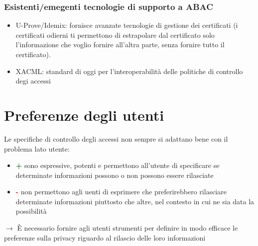 \documentclass{report}
\begin{document}
\subsubsection{Esistenti/emegenti tecnologie di supporto a ABAC}
\begin{itemize}
    \item U-Prove/Idemix: fornisce avanzate tecnologie di gestione dei certificati (i certificati odierni ti permettono di estrapolare dal certificato solo
    l'informazione che voglio fornire all'altra parte, senza fornire tutto il certificato).
    \item XACML: standard di oggi per l'interoperabilità delle politiche di controllo degi accessi
\end{itemize}

\newpage
\section{Preferenze degli utenti}

Le specifiche di controllo degli accessi non sempre si adattano bene con il problema lato utente:
\begin{itemize}
    \item \textcolor{darkgreen}{\textbf{+}} sono espressive, potenti e permettono all'utente di specificare se determinate informazioni possono o non possono essere rilasciate
    \item \textcolor{red}{\textbf{-}} non permettono agli uenti di esprimere che preferirebbero rilasciare determinate informazioni piuttosto che altre, nel contesto in cui ne sia data la possibilità
\end{itemize}

$\rightarrow$ È necessario fornire agli utenti strumenti per definire in modo efficace le preferenze sulla privacy riguardo al rilascio delle loro informazioni
\end{document}
